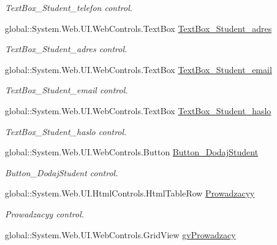 \begin{DoxyCompactItemize}
\begin{DoxyCompactList}\small\item\em Text\+Box\+\_\+\+Student\+\_\+telefon control. \end{DoxyCompactList}\item 
global\+::\+System.\+Web.\+U\+I.\+Web\+Controls.\+Text\+Box \hyperlink{class_dziennik_ocen_web2_1_1_web_form1_a36396ec2cf6138ceca37d487ee5b3bd0}{Text\+Box\+\_\+\+Student\+\_\+adres}
\begin{DoxyCompactList}\small\item\em Text\+Box\+\_\+\+Student\+\_\+adres control. \end{DoxyCompactList}\item 
global\+::\+System.\+Web.\+U\+I.\+Web\+Controls.\+Text\+Box \hyperlink{class_dziennik_ocen_web2_1_1_web_form1_afee4730e92c30198c0ed19d8fcfbe9a7}{Text\+Box\+\_\+\+Student\+\_\+email}
\begin{DoxyCompactList}\small\item\em Text\+Box\+\_\+\+Student\+\_\+email control. \end{DoxyCompactList}\item 
global\+::\+System.\+Web.\+U\+I.\+Web\+Controls.\+Text\+Box \hyperlink{class_dziennik_ocen_web2_1_1_web_form1_a0585ebb82159573ec49d9f45cb41e867}{Text\+Box\+\_\+\+Student\+\_\+haslo}
\begin{DoxyCompactList}\small\item\em Text\+Box\+\_\+\+Student\+\_\+haslo control. \end{DoxyCompactList}\item 
global\+::\+System.\+Web.\+U\+I.\+Web\+Controls.\+Button \hyperlink{class_dziennik_ocen_web2_1_1_web_form1_a4edf892602856b446ff7faa57b3cd60d}{Button\+\_\+\+Dodaj\+Student}
\begin{DoxyCompactList}\small\item\em Button\+\_\+\+Dodaj\+Student control. \end{DoxyCompactList}\item 
global\+::\+System.\+Web.\+U\+I.\+Html\+Controls.\+Html\+Table\+Row \hyperlink{class_dziennik_ocen_web2_1_1_web_form1_a09925c3ffc18a518cf5b176db72f0d6a}{Prowadzacyy}
\begin{DoxyCompactList}\small\item\em Prowadzacyy control. \end{DoxyCompactList}\item 
global\+::\+System.\+Web.\+U\+I.\+Web\+Controls.\+Grid\+View \hyperlink{class_dziennik_ocen_web2_1_1_web_form1_a9ee1e1f33472450888de9bbc4834a8bf}{gv\+Prowadzacy}

\end{DoxyCompactItemize}
